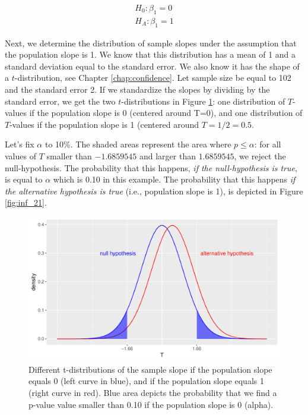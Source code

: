 \documentclass[]{report}\usepackage[]{graphicx}\usepackage[]{color}
\makeatletter
\def\maxwidth{ %
  \ifdim\Gin@nat@width>\linewidth
    \linewidth
  \else
    \Gin@nat@width
  \fi
}
\newenvironment{knitrout}{}{} %
\makeatother
\begin{document}
\begin{eqnarray}
H_0: \beta_1 =0 \nonumber \\
H_A: \beta_1 = 1\nonumber
\end{eqnarray}


Next, we determine the distribution of sample slopes under the assumption that the population slope is 1. We know that this distribution has a mean of 1 and a standard deviation equal to the standard error. We also know it has the shape of a $t$-distribution, see Chapter \ref{chap:confidence}. Let sample size be equal to 102 and the standard error 2. If we standardize the slopes by dividing by the standard error, we get the two $t$-distributions in Figure \ref{fig:inf_20}: one distribution of $T$-values if the population slope is 0 (centered around T=0), and one distribution of $T$-values if the population slope is 1 (centered around $T=1/2=0.5$.

Let's fix $\alpha$ to 10\%. The shaded areas represent the area where $p \leq \alpha$: for all values of $T$ smaller than $-1.6859545$ and larger than $1.6859545$, we reject the null-hypothesis. The probability that this happens, \textit{if the null-hypothesis is true}, is equal to $\alpha$ which is 0.10 in this example. The probability that this happens \textit{if the alternative hypothesis is true} (i.e., population slope is 1), is depicted in Figure \ref{fig:inf_21}.


\begin{knitrout}
\color{fgcolor}\begin{figure}

{\centering \includegraphics[width=\maxwidth]{figure/inf_20-1} 

}

\caption[Different t-distributions of the sample slope if the population slope equals 0 (left curve in blue), and if the population slope equals 1 (right curve in red)]{Different t-distributions of the sample slope if the population slope equals 0 (left curve in blue), and if the population slope equals 1 (right curve in red). Blue area depicts the probability that we find a p-value value smaller than 0.10 if the population slope is 0 (alpha).}\label{fig:inf_20}
\end{figure}


\end{knitrout}
\end{document}
